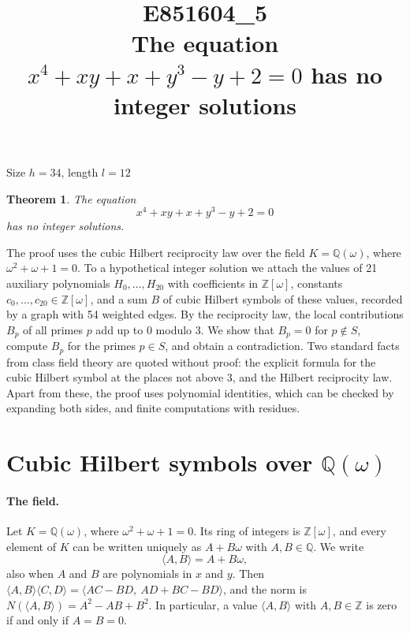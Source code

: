 \documentclass[11pt]{article}
\title{\textbf{E851604\_5}\\[4pt] {\Large The equation $x^{4}+xy+x+y^{3}-y+2=0$ has no integer solutions}}
\author{}
\date{}
\newtheorem{theorem}{Theorem}
\newcommand{\Z}{\mathbb{Z}}
\newcommand{\Q}{\mathbb{Q}}
\begin{document}
\maketitle
\vspace{-8ex}
\begin{center}
Size $h=34$, length $l=12$
\end{center}

\begin{theorem}\label{thm:main}
The equation
\begin{equation}\label{eq:main}
x^{4}+xy+x+y^{3}-y+2=0
\end{equation}
has no integer solutions.
\end{theorem}

The proof uses the cubic Hilbert reciprocity law over the field $K=\Q(\omega)$, where $\omega^2+\omega+1=0$. To a hypothetical integer solution we attach the values of 21 auxiliary polynomials $H_0,\dots,H_{20}$ with coefficients in $\Z[\omega]$, constants $c_0,\dots,c_{20}\in\Z[\omega]$, and a sum $B$ of cubic Hilbert symbols of these values, recorded by a graph with 54 weighted edges. By the reciprocity law, the local contributions $B_p$ of all primes $p$ add up to $0$ modulo $3$. We show that $B_p=0$ for $p\notin S$, compute $B_p$ for the primes $p\in S$, and obtain a contradiction. Two standard facts from class field theory are quoted without proof: the explicit formula for the cubic Hilbert symbol at the places not above $3$, and the Hilbert reciprocity law. Apart from these, the proof uses polynomial identities, which can be checked by expanding both sides, and finite computations with residues.


\section{\texorpdfstring{Cubic Hilbert symbols over $\Q(\omega)$}{Cubic Hilbert symbols over Q(w)}}\label{sec:symbols}

\paragraph{The field.} Let $K=\Q(\omega)$, where $\omega^2+\omega+1=0$. Its ring of integers is $\Z[\omega]$, and every element of $K$ can be written uniquely as $A+B\omega$ with $A,B\in\Q$. We write
\[
\langle A,B\rangle=A+B\omega,
\]
also when $A$ and $B$ are polynomials in $x$ and $y$. Then $\langle A,B\rangle\langle C,D\rangle=\langle AC-BD,\ AD+BC-BD\rangle$, and the norm is $N(\langle A,B\rangle)=A^2-AB+B^2$. In particular, a value $\langle A,B\rangle$ with $A,B\in\Z$ is zero if and only if $A=B=0$.
\end{document}
